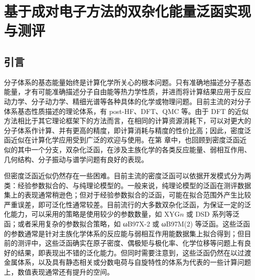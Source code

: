
\chapter{基于成对电子方法的双杂化能量泛函实现与测评}
\label{sec.2.title}

\section{引言}

分子体系的基态能量始终是计算化学所关心的根本问题。只有准确地描述分子基态能量，才有可能准确描述分子自由能等热力学性质，并进而将计算结果应用于反应动力学、分子动力学、精细光谱等各种具体的化学或物理问题。目前主流的对分子体系基态性质描述的理论体系，有 post-HF、DFT、QMC 等。由于 DFT 的近似方法相比于其它理论框架下的方法而言，在相同的计算资源消耗下，可以对更大的分子体系作计算、并有更高的精度，即计算消耗与精度的性价比高；因此，密度泛函近似在计算化学应用受到广泛的欢迎与使用。在第  章中，也回顾到密度泛函近似的其中一个分支，双杂化泛函，在涉及主族化学的各类反应能量、弱相互作用、几何结构、分子振动与谱学问题有良好的表现。

但密度泛函近似仍然存在一些困难。目前主流的密度泛函可以依据开发模式分为两类：经验参数拟合的、与纯理论模型的。一般来说，纯理论模型的泛函在测评数据集上的表现通常稍逊色\cite{Goerigk-Grimme.PCCP.2017}；但对于经验参数拟合的泛函，可能在拟合范围外产生比较严重误差，即可泛化性通常较差\cite{Medvedev-Lyssenko.S.2017}。目前流行的大多数双杂化泛函，为保证一定的泛化能力，可以采用的策略是使用较少的参数数量，如 XYG$n$\cite{Zhang-Xu.JPCL.2021} 或 DSD 系列\cite{Kozuch-Martin.JCC.2013}等泛函；或者采用复杂的参数拟合策略，如 ωB97X-2 或 ωB97M(2) 等泛函。这些泛函的参数通常是针对主族化学体系的反应能与弱相互作用能数据集上拟合得到；但目前的测评中，这些泛函确实在原子密度\cite{Su-Xu.PNAS.2018}、偶极矩与极化率\cite{Hait-Head-Gordon.JCTC.2018, Hait-Head-Gordon.PCCP.2018}、化学位移\cite{Stoychev-Neese.JCTC.2018}等问题上有良好的结果，即表现出不错的泛化能力。但同时需要注意到，这些泛函仍然在以过渡金属体系，以及具有静态相关或分数电荷与自旋特性的体系为代表的一些计算问题上，数值表现通常还有提升的空间\cite{Cohen-Yang.S.2008, Mori-Sanchez-Yang.PRL.2009, Hesselmann-Goerling.PRL.2011, Cohen-Yang.CR.2012, Zhang-Scheffler.PRL.2016,Zhang-Xu.JPCL.2021}。

